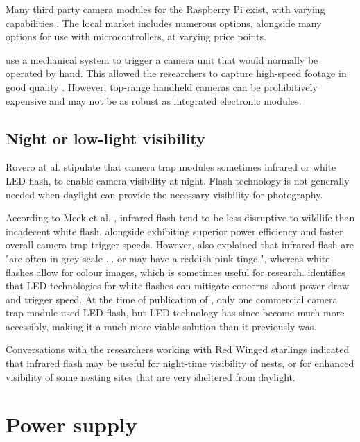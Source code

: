 \documentclass[class=report,11pt,crop=false]{standalone}
\begin{document}
Many third party camera modules for the Raspberry Pi exist, with varying capabilities \cite{jolles2021broad-scale}. The local market includes numerous options, alongside many options for use with microcontrollers, at varying price points.

\cite{rico-guevara2017bring} use a mechanical system to trigger a camera unit that would normally be operated by hand. This allowed the researchers to capture high-speed footage in good quality \cite{rico-guevara2017bring}. However, top-range handheld cameras can be prohibitively expensive and may not be as robust as integrated electronic modules.

\subsection{Night or low-light visibility}

Rovero at al. \cite{rovero2013which} stipulate that camera trap modules sometimes infrared or white LED flash, to enable camera visibility at night. Flash technology is not generally needed when daylight can provide the necessary visibility for photography.

According to Meek et al. \cite{meek2012introduction}, infrared flash tend to be less disruptive to wildlife than incadecent white flash, alongside exhibiting superior power efficiency and faster overall camera trap trigger speeds. However, \cite{meek2012introduction} also explained that infrared flash are "are often in grey-scale ... or may have a
reddish-pink tinge.", whereas white flashes allow for colour images, which is sometimes useful for research. \cite{meek2012introduction} identifies that LED technologies for white flashes can mitigate concerns about power draw and trigger speed. At the time of publication of \cite{meek2012introduction}, only one commercial camera trap module used LED flash, but LED technology has since become much more accessibly, making it a much more viable solution than it previously was.

Conversations with the researchers working with Red Winged starlings \cite{hofmeyer2024private} indicated that infrared flash may be useful for night-time visibility of nests, or for enhanced visibility of some nesting sites that are very sheltered from daylight.


\section{Power supply}
\end{document}
